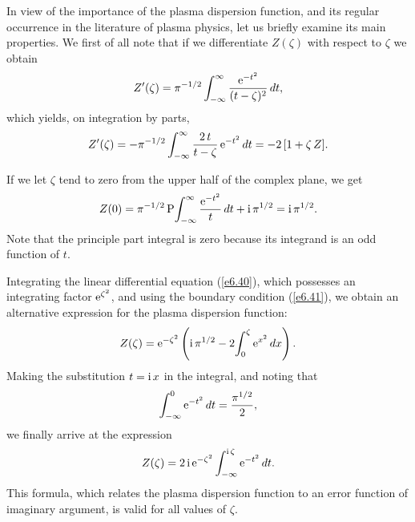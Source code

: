 In view of the importance of the plasma dispersion function, and its regular
occurrence in the literature of plasma physics, let us briefly examine its main
properties. We first of all note that if we differentiate $Z(\zeta)$ with
respect to $\zeta$ we obtain
\begin{equation}
Z'(\zeta) = \pi^{-1/2}\int_{-\infty}^{\infty} \frac{{\rm e}^{-t^2}}{(t-\zeta)^2}\,
dt,
\end{equation}
which yields, on integration by parts,
\begin{equation}\label{e6.40}
Z'(\zeta) =-\pi^{-1/2}\int_{-\infty}^{\infty} \frac{2\,t}{t-\zeta}\,
{\rm e}^{-t^2}\,dt = -2\,[1+\zeta\,Z].
\end{equation}

If we let $\zeta$ tend to zero from the upper half  of the complex plane, we get
\begin{equation}\label{e6.41}
Z(0) = \pi^{-1/2}\,{\rm P}\!\int_{-\infty}^{\infty} \frac{{\rm e}^{-t^2}}{t}\,dt
+ {\rm i}\,\pi^{1/2} = {\rm i}\,\pi^{1/2}.
\end{equation}
Note that the principle part integral is zero  because its integrand is an
odd function of $t$.

Integrating the linear differential equation (\ref{e6.40}), which possesses an
integrating factor ${\rm e}^{\zeta^2}$, and using the boundary condition
(\ref{e6.41}), we obtain an alternative expression for the plasma dispersion
function:
\begin{equation}
Z(\zeta) = {\rm e}^{-\zeta^2}\left({\rm i}\,\pi^{1/2}
-2\!\int_0^\zeta {\rm e}^{x^2}\,dx\right).
\end{equation}
Making the substitution $t={\rm i}\,x$ in the integral, and
noting that
\begin{equation}
\int_{-\infty}^0 {\rm e}^{-t^2}\,dt = \frac{\pi^{1/2}}{2},
\end{equation}
we finally arrive at the expression
\begin{equation}
Z(\zeta) = 2\,{\rm i}\, {\rm e}^{-\zeta^2}\int_{-\infty}^{{\rm i}\,\zeta}
{\rm e}^{-t^2}\,dt.
\end{equation}
This formula, which relates the plasma dispersion function to an
error function of imaginary argument, is valid for all values
of $\zeta$. 

